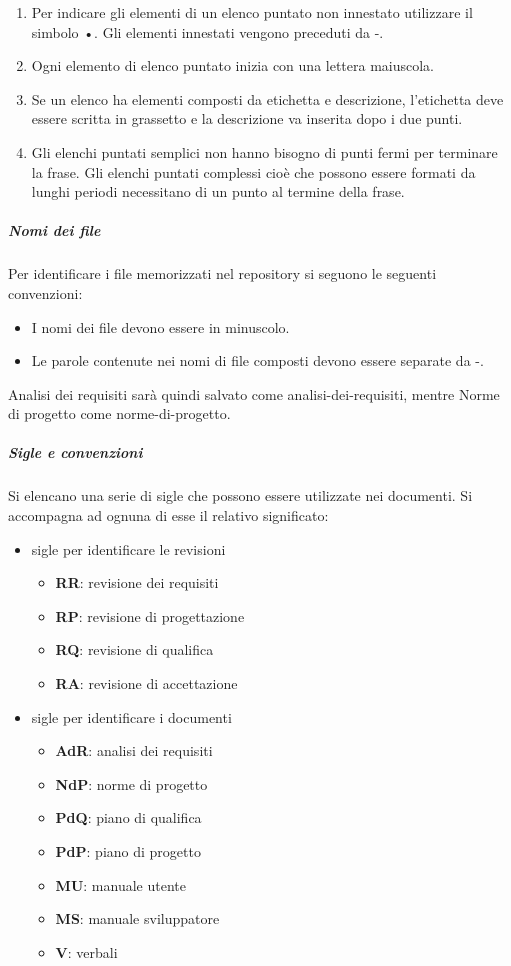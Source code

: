 \documentclass[../norme-di-progetto.tex]{subfiles}
\begin{document}
\begin{enumerate}
  \item Per indicare gli elementi di un elenco puntato non innestato utilizzare il simbolo •. Gli elementi innestati vengono preceduti da -.
  \item Ogni elemento di elenco puntato inizia con una lettera maiuscola.
  \item Se un elenco ha elementi composti da etichetta e descrizione, l'etichetta deve essere scritta in grassetto e la descrizione va inserita dopo i due punti.
  \item Gli elenchi puntati semplici non hanno bisogno di punti fermi per terminare la frase. Gli elenchi puntati complessi cioè che possono essere formati da lunghi periodi necessitano di un punto al termine della frase.
\end{enumerate}

\subparagraph{Nomi dei file}%
\label{nomi dei file}
Per identificare i file memorizzati nel repository si seguono le seguenti convenzioni:

\begin{itemize}
  \item I nomi dei file devono essere in minuscolo.
  \item Le parole contenute nei nomi di file composti devono essere separate da -.
\end{itemize}

Analisi dei requisiti sarà quindi salvato come analisi-dei-requisiti, mentre Norme di progetto come norme-di-progetto.

\subparagraph{Sigle e convenzioni}%
\label{sigle e convenzioni}
Si elencano una serie di sigle che possono essere utilizzate nei documenti. Si accompagna ad ognuna di esse il relativo significato:

\begin{itemize}
  \item sigle per identificare le revisioni
  \begin{itemize}
    \item \textbf{RR}: revisione dei requisiti
    \item \textbf{RP}: revisione di progettazione
    \item \textbf{RQ}: revisione di qualifica
    \item \textbf{RA}: revisione di accettazione
  \end{itemize}
  \item sigle per identificare i documenti
  \begin{itemize}
    \item \textbf{AdR}: analisi dei requisiti
    \item \textbf{NdP}: norme di progetto
    \item \textbf{PdQ}: piano di qualifica
    \item \textbf{PdP}: piano di progetto
    \item \textbf{MU}: manuale utente
    \item \textbf{MS}: manuale sviluppatore
    \item \textbf{V}: verbali
   \end{itemize}
 \end{itemize}
\end{document}
